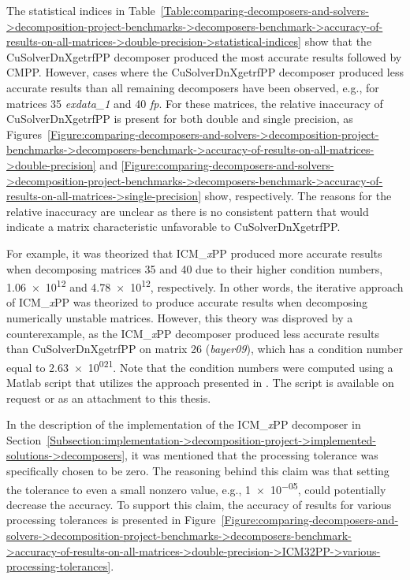 The statistical indices in Table~\ref{Table:comparing-decomposers-and-solvers->decomposition-project-benchmarks->decomposers-benchmark->accuracy-of-results-on-all-matrices->double-precision->statistical-indices} show that the CuSolverDnXgetrfPP decomposer produced the most accurate results followed by CMPP. However, cases where the CuSolverDnXgetrfPP decomposer produced less accurate results than all remaining decomposers have been observed, e.g., for matrices 35 \textit{exdata\_1} and 40 \textit{fp}. For these matrices, the relative inaccuracy of CuSolverDnXgetrfPP is present for both double and single precision, as Figures~\ref{Figure:comparing-decomposers-and-solvers->decomposition-project-benchmarks->decomposers-benchmark->accuracy-of-results-on-all-matrices->double-precision} and \ref{Figure:comparing-decomposers-and-solvers->decomposition-project-benchmarks->decomposers-benchmark->accuracy-of-results-on-all-matrices->single-precision} show, respectively. The reasons for the relative inaccuracy are unclear as there is no consistent pattern that would indicate a matrix characteristic unfavorable to CuSolverDnXgetrfPP.

For example, it was theorized that ICM\_\textit{x}PP produced more accurate results when decomposing matrices 35 and 40 due to their higher condition numbers, \num{1.06e+12} and \num{4.78e+12}, respectively. In other words, the iterative approach of ICM\_\textit{x}PP was theorized to produce accurate results when decomposing numerically unstable matrices. However, this theory was disproved by a counterexample, as the ICM\_\textit{x}PP decomposer produced less accurate results than CuSolverDnXgetrfPP on matrix 26 (\textit{bayer09}), which has a condition number equal to \num{2.63e+021}. Note that the condition numbers were computed using a Matlab script that utilizes the approach presented in  \cite{Davis2010, Amestoy1996, Amestoy2004}. The script is available on request or as an attachment to this thesis.

In the description of the implementation of the ICM\_\textit{x}PP decomposer in Section~\ref{Subsection:implementation->decomposition-project->implemented-solutions->decomposers}, it was mentioned that the processing tolerance was specifically chosen to be zero. The reasoning behind this claim was that setting the tolerance to even a small nonzero value, e.g., \num{1e-05}, could potentially decrease the accuracy. To support this claim, the accuracy of results for various processing tolerances is presented in Figure~\ref{Figure:comparing-decomposers-and-solvers->decomposition-project-benchmarks->decomposers-benchmark->accuracy-of-results-on-all-matrices->double-precision->ICM32PP->various-processing-tolerances}.

